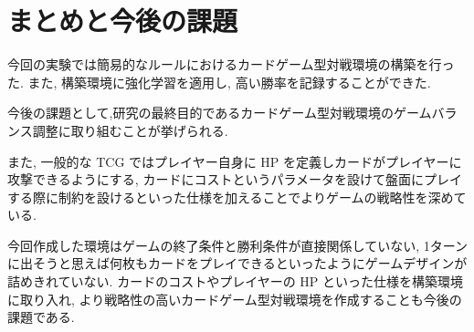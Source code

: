 \documentclass[twocolumn]{jarticle}     %
\begin{document}
\section{まとめと今後の課題}
今回の実験では簡易的なルールにおけるカードゲーム型対戦環境の構築を行った.
また, 構築環境に強化学習を適用し, 高い勝率を記録することができた.
\par
今後の課題として,研究の最終目的であるカードゲーム型対戦環境のゲームバランス調整に取り組むことが挙げられる.\par
また, 一般的な TCG ではプレイヤー自身に HP を定義しカードがプレイヤーに攻撃できるようにする, カードにコストというパラメータを設けて盤面にプレイする際に制約を設けるといった仕様を加えることでよりゲームの戦略性を深めている. \par
今回作成した環境はゲームの終了条件と勝利条件が直接関係していない, 1ターンに出そうと思えば何枚もカードをプレイできるといったようにゲームデザインが詰めきれていない. カードのコストやプレイヤーの HP といった仕様を構築環境に取り入れ, より戦略性の高いカードゲーム型対戦環境を作成することも今後の課題である.






\end{document}
